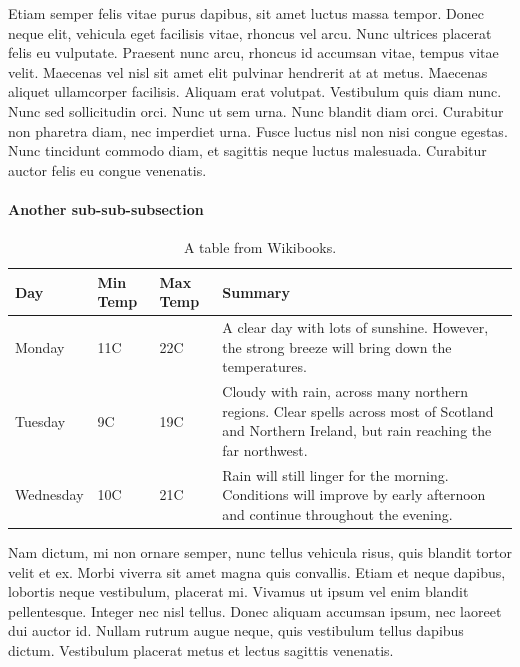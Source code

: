\documentclass{article}
\begin{document}
Etiam semper felis vitae purus dapibus, sit amet luctus massa tempor. Donec neque elit, vehicula eget facilisis vitae, rhoncus vel arcu. Nunc ultrices placerat felis eu vulputate. Praesent nunc arcu, rhoncus id accumsan vitae, tempus vitae velit. Maecenas vel nisl sit amet elit pulvinar hendrerit at at metus. Maecenas aliquet ullamcorper facilisis. Aliquam erat volutpat. Vestibulum quis diam nunc. Nunc sed sollicitudin orci. Nunc ut sem urna. Nunc blandit diam orci. Curabitur non pharetra diam, nec imperdiet urna. Fusce luctus nisl non nisi congue egestas. Nunc tincidunt commodo diam, et sagittis neque luctus malesuada. Curabitur auctor felis eu congue venenatis.


\paragraph{Another sub-sub-subsection}
\label{paragraph: Another sub-sub-subsection}

\begin{table}[h]
    \caption[A table.]{A table from Wikibooks.}
    \label{table: Table}          %
    \begin{center}
        \begin{tabular}{ | l | l | l | p{5cm} |}
        \hline
        Day & Min Temp & Max Temp & Summary \\ \hline
        Monday & 11C & 22C & A clear day with lots of sunshine.  
        However, the strong breeze will bring down the temperatures. \\ \hline
        Tuesday & 9C & 19C & Cloudy with rain, across many northern regions. Clear spells 
        across most of Scotland and Northern Ireland, 
        but rain reaching the far northwest. \\ \hline
        Wednesday & 10C & 21C & Rain will still linger for the morning. 
        Conditions will improve by early afternoon and continue 
        throughout the evening. \\
        \hline
        \end{tabular}
    \end{center}
\end{table}


Nam dictum, mi non ornare semper, nunc tellus vehicula risus, quis blandit tortor velit et ex. Morbi viverra sit amet magna quis convallis. Etiam et neque dapibus, lobortis neque vestibulum, placerat mi. Vivamus ut ipsum vel enim blandit pellentesque. Integer nec nisl tellus. Donec aliquam accumsan ipsum, nec laoreet dui auctor id. Nullam rutrum augue neque, quis vestibulum tellus dapibus dictum. Vestibulum placerat metus et lectus sagittis venenatis.
\end{document}
